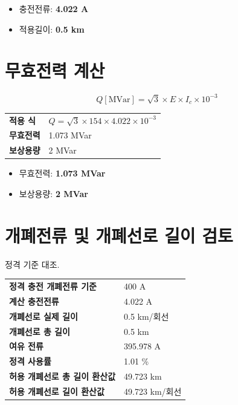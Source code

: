 \documentclass[11pt,a4paper]{article}
\begin{document}
\begin{summarybox}
\begin{itemize}[leftmargin=6mm, itemsep=2pt, topsep=4pt]
\item 충전전류: \textbf{4.022 A}
\item 적용길이: \textbf{0.5 km}
\end{itemize}
\end{summarybox}

\section{무효전력 계산}

\[
Q[\mathrm{MVar}] = \sqrt{3}\times E \times I_c \times 10^{-3}
\]

\begin{tabularx}{\textwidth}{>{\bfseries}p{45mm}X}
적용 식 & $Q = \sqrt{3}\times 154 \times 4.022 \times 10^{-3}$ \\
무효전력 & 1.073 MVar \\
보상용량 & 2 MVar \\
\end{tabularx}

\begin{summarybox}
\begin{itemize}[leftmargin=6mm, itemsep=2pt, topsep=4pt]
\item 무효전력: \textbf{1.073 MVar}
\item 보상용량: \textbf{2 MVar}
\end{itemize}
\end{summarybox}

\section{개폐전류 및 개폐선로 길이 검토}

정격 기준 대조.

\begin{tabularx}{\textwidth}{>{\bfseries}p{55mm}X}
정격 충전 개폐전류 기준 & 400 A \\
계산 충전전류 & 4.022 A \\
개폐선로 실제 길이 & 0.5 km/회선 \\
개폐선로 총 길이 & 0.5 km \\
여유 전류 & 395.978 A \\
정격 사용률 & 1.01 \% \\
허용 개폐선로 총 길이 환산값 & 49.723 km \\
허용 개폐선로 길이 환산값 & 49.723 km/회선 \\
\end{tabularx}
\end{document}

